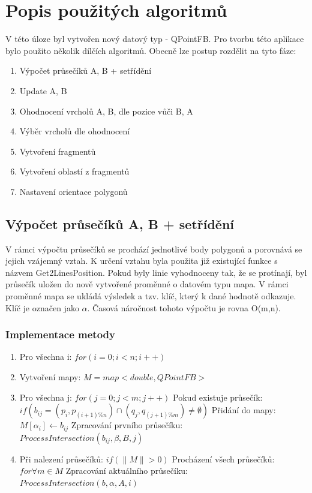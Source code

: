 \documentclass[a4paper, 12pt]{article}
\begin{document}
\section{Popis použitých algoritmů}
V této úloze byl vytvořen nový datový typ - QPointFB. Pro tvorbu této aplikace bylo použito několik dílčích algoritmů. Obecně lze postup rozdělit na tyto fáze:

\begin{enumerate}
\item Výpočet průsečíků A, B + setřídění
\item Update A, B
\item Ohodnocení vrcholů A, B, dle pozice vůči B, A
\item Výběr vrcholů dle ohodnocení
\item Vytvoření fragmentů
\item Vytvoření oblastí z fragmentů
\item Nastavení orientace polygonů
\end{enumerate}

\subsection{Výpočet průsečíků A, B + setřídění}
V rámci výpočtu průsečíků se prochází jednotlivé body polygonů a porovnává se jejich vzájemný vztah. K určení vztahu byla použita již existující funkce s názvem Get2LinesPosition. Pokud byly linie vyhodnoceny tak, že se protínají, byl průsečík uložen do nově vytvořené proměnné o datovém typu mapa. V rámci proměnné mapa se ukládá výsledek a tzv. klíč, který k dané hodnotě odkazuje. Klíč je označen jako $\alpha$. Časová náročnost tohoto výpočtu je rovna O(m,n).

\subsubsection{Implementace metody}
\begin{enumerate}
\item Pro všechna i: $for (i = 0; i < n; i++)$
\item Vytvoření mapy: $ M = map<double, QPointFB>$
\item Pro všechna j: $for (j = 0; j < m; j++)$
\subitem Pokud existuje průsečík: $if (b_{ij} = (p_i, p_{(i+1)\%n}) \cap (q_j, q_{(j+1)\%m})  \neq \emptyset  )$
\subitem Přidání do mapy: $M[\alpha_i] \leftarrow b_{ij}$
\subitem Zpracování prvního průsečíku: $ProcessIntersection (b_{ij}, \beta, B, j)$
\item Při nalezení průsečíků: $if (\| M \| > 0) $
\subitem Procházení všech průsečíků: $for \forall m \in M$
\subitem Zpracování aktuálního průsečíku: $ProcessIntersection(b, \alpha, A, i)$

\end{enumerate}
\end{document}

